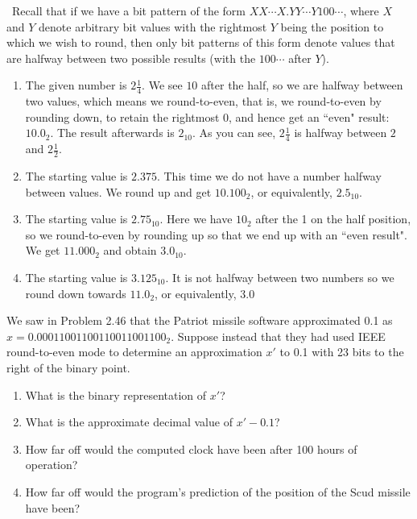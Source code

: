\documentclass[12pt]{article}
\newenvironment{ex}[2][Exercise]{\begin{trivlist}
		\item[\hskip \labelsep {\bfseries #1}\hskip \labelsep {\bfseries #2.}]}{\end{trivlist}}
\newenvironment{sol}[1][Solution]{\begin{trivlist}
		\item[\hskip \labelsep {\bfseries #1:}]}{\end{trivlist}}
\begin{document}
\begin{sol}
	\
	Recall that if we have a bit pattern of the form $XX\cdots X.YY\cdots Y100\cdots$,
	where $X$ and $Y$ denote arbitrary bit values with the rightmost $Y$ being the
	position to which we wish to round, then only bit patterns of this form denote
	values that are halfway between two possible results (with the $100\cdots$ after $Y$).
	\begin{enumerate}[label=(\alph*)]
		\item The given number is $2\frac{1}{4}$. We see $10$ after the half, so
		we are halfway between two values, which means we round-to-even, that is, we
		round-to-even by rounding down, to retain the rightmost 0, and hence get
		an ``even" result: $10.0_2$. The result afterwards is $2_{10}$. As you can 
		see, $2\frac{1}{4}$ is halfway between $2$ and $2\frac{1}{2}$.
		\item The starting value is $2.375$. This time we do not have a number
		halfway between values. We round up and get $10.100_2$, or equivalently, $2.5_{10}$.
		\item The starting value is $2.75_{10}$. Here we have $10_2$ after the 1 on the
		half position, so we round-to-even by rounding up so that we end up with an
		``even result". We get $11.000_2$ and obtain $3.0_{10}$.
		\item The starting value is $3.125_{10}$. It is not halfway between two
		numbers so we round down towards $11.0_2$, or equivalently, $3.0$
	\end{enumerate}
\end{sol}

\begin{ex}{2.51}
	We saw in Problem 2.46 that the Patriot missile software approximated 0.1 as
	$x=0.00011001100110011001100_2$. Suppose instead that they had used IEEE round-to-even
	mode to determine an approximation $x'$ to 0.1 with 23 bits to the right of the
	binary point.
	\begin{enumerate}[label=(\alph*)]
		\item What is the binary representation of $x'$?
		\item What is the approximate decimal value of $x'-0.1$?
		\item How far off would the computed clock have been after 100 hours of
		operation?
		\item How far off would the program's prediction of the position of the
		Scud missile have been?
	\end{enumerate}
\end{ex}
\end{document}
